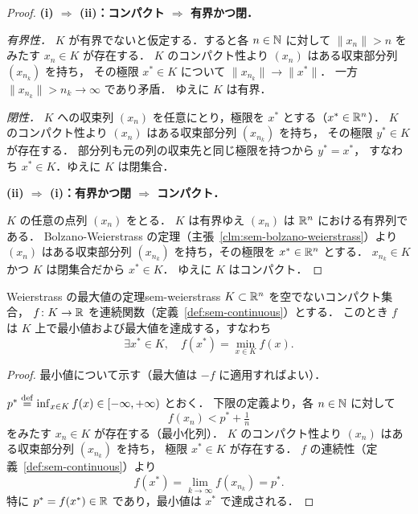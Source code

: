 \begin{proof}
  \textbf{(i) $\Rightarrow$ (ii)：コンパクト $\Rightarrow$ 有界かつ閉．}

  \textit{有界性．}
  $K$ が有界でないと仮定する．すると各 $n \in \mathbb{N}$ に対して
  $\|x_n\| > n$ をみたす $x_n \in K$ が存在する．
  $K$ のコンパクト性より $(x_n)$ はある収束部分列 $(x_{n_k})$ を持ち，
  その極限 $x^* \in K$ について $\|x_{n_k}\| \to \|x^*\|$．
  一方 $\|x_{n_k}\| > n_k \to \infty$ であり矛盾．
  ゆえに $K$ は有界．

  \textit{閉性．}
  $K$ への収束列 $(x_n)$ を任意にとり，極限を $x^*$ とする（$x^* \in \mathbb{R}^n$）．
  $K$ のコンパクト性より $(x_n)$ はある収束部分列 $(x_{n_k})$ を持ち，
  その極限 $y^* \in K$ が存在する．
  部分列も元の列の収束先と同じ極限を持つから $y^* = x^*$，
  すなわち $x^* \in K$．ゆえに $K$ は閉集合．

  \textbf{(ii) $\Rightarrow$ (i)：有界かつ閉 $\Rightarrow$ コンパクト．}

  $K$ の任意の点列 $(x_n)$ をとる．
  $K$ は有界ゆえ $(x_n)$ は $\mathbb{R}^n$ における有界列である．
  Bolzano-Weierstrass の定理（主張~\ref{clm:sem-bolzano-weierstrass}）より
  $(x_n)$ はある収束部分列 $(x_{n_k})$ を持ち，その極限を $x^* \in \mathbb{R}^n$ とする．
  $x_{n_k} \in K$ かつ $K$ は閉集合だから $x^* \in K$．
  ゆえに $K$ はコンパクト．
\end{proof}

\begin{theorem}{Weierstrass の最大値の定理}{sem-weierstrass}
  $K \subset \mathbb{R}^n$ を空でないコンパクト集合，
  $f \colon K \to \mathbb{R}$ を連続関数（定義~\ref{def:sem-continuous}）とする．
  このとき $f$ は $K$ 上で最小値および最大値を達成する，すなわち
  \[
    \exists x^* \in K,\quad f(x^*) = \min_{x \in K} f(x).
  \]
\end{theorem}

\begin{proof}
  最小値について示す（最大値は $-f$ に適用すればよい）．

  $p^* \overset{\mathrm{def}}{=} \inf_{x \in K} f(x) \in [-\infty, +\infty)$ とおく．
  下限の定義より，各 $n \in \mathbb{N}$ に対して
  \[
    f(x_n) < p^* + \tfrac{1}{n}
  \]
  をみたす $x_n \in K$ が存在する（最小化列）．
  $K$ のコンパクト性より $(x_n)$ はある収束部分列 $(x_{n_k})$ を持ち，
  極限 $x^* \in K$ が存在する．
  $f$ の連続性（定義~\ref{def:sem-continuous}）より
  \[
    f(x^*) = \lim_{k \to \infty} f(x_{n_k}) = p^*.
  \]
  特に $p^* = f(x^*) \in \mathbb{R}$ であり，最小値は $x^*$ で達成される．
\end{proof}

